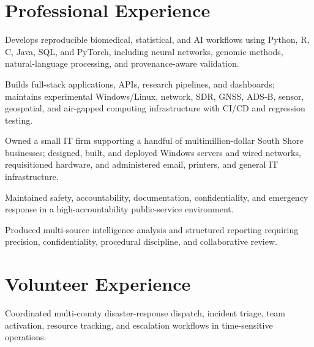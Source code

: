 \documentclass[10.5pt,letterpaper]{article}
\begin{document}
\section*{Professional Experience}
\begin{cvbullets}
    \item Develops reproducible biomedical, statistical, and AI workflows using Python, R, C, Java, SQL, and PyTorch, including neural networks, genomic methods, natural-language processing, and provenance-aware validation.
    \item Builds full-stack applications, APIs, research pipelines, and dashboards; maintains experimental Windows/Linux, network, SDR, GNSS, ADS-B, sensor, geospatial, and air-gapped computing infrastructure with CI/CD and regression testing.
\end{cvbullets}


\begin{cvbullets}
    \item Owned a small IT firm supporting a handful of multimillion-dollar South Shore businesses; designed, built, and deployed Windows servers and wired networks, requisitioned hardware, and administered email, printers, and general IT infrastructure.
\end{cvbullets}


\begin{cvbullets}
    \item Maintained safety, accountability, documentation, confidentiality, and emergency response in a high-accountability public-service environment.
\end{cvbullets}

\begin{cvbullets}
    \item Produced multi-source intelligence analysis and structured reporting requiring precision, confidentiality, procedural discipline, and collaborative review.
\end{cvbullets}

\section*{Volunteer Experience}
\begin{cvbullets}
    \item Coordinated multi-county disaster-response dispatch, incident triage, team activation, resource tracking, and escalation workflows in time-sensitive operations.
\end{cvbullets}
\end{document}
